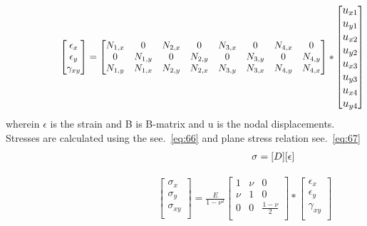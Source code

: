 \documentclass[fleqn, 12.5pt,a4paper]{report}
\begin{document}
\begin{align}\label{eq:65}
\hspace{2cm}\begin{bmatrix}
\epsilon_x\\
\epsilon_y\\
\gamma_{xy}\\
\end{bmatrix}
=
\begin{bmatrix}
N_{1,x} & 0 & N_{2,x} & 0 & N_{3,x} & 0 & N_{4,x} & 0 \\
0 & N_{1,y} & 0 & N_{2,y} & 0 & N_{3,y} & 0 & N_{4,y}\\
N_{1,y} & N_{1,x} & N_{2,y} & N_{2,x} & N_{3,y} & N_{3,x} & N_{4,y} & N_{4,x}
\end{bmatrix}
*
\large \begin{bmatrix}
u_{x1}\\
u_{y1}\\
u_{x2}\\
u_{y2}\\
u_{x3}\\
u_{y3}\\
u_{x4}\\
u_{y4}\\
\end{bmatrix} \large
\end{align}
wherein $\epsilon$ is the strain and B is B-matrix and u is the nodal displacements.
\newline
Stresses are calculated using the see.~\autoref{eq:66} and plane stress relation see.~\autoref{eq:67}
\begin{align}\label{eq:66}
\hspace{6.25cm}\sigma = [D][\epsilon]
\end{align}

\begin{align}\label{eq:67}
\hspace{5cm}\begin{bmatrix}
\sigma_x\\
\sigma_y\\
\sigma_{xy}\\
\end{bmatrix}
=
\frac{E}{1-\nu^2}
\begin{bmatrix}
1 & \nu & 0\\
\nu & 1 & 0\\
0 & 0 & \frac{1-\nu}{2}\\
\end{bmatrix}
*
\begin{bmatrix}
\epsilon_x\\
\epsilon_y\\
\gamma_{xy}\\
\end{bmatrix}
\end{align}
\end{document}
